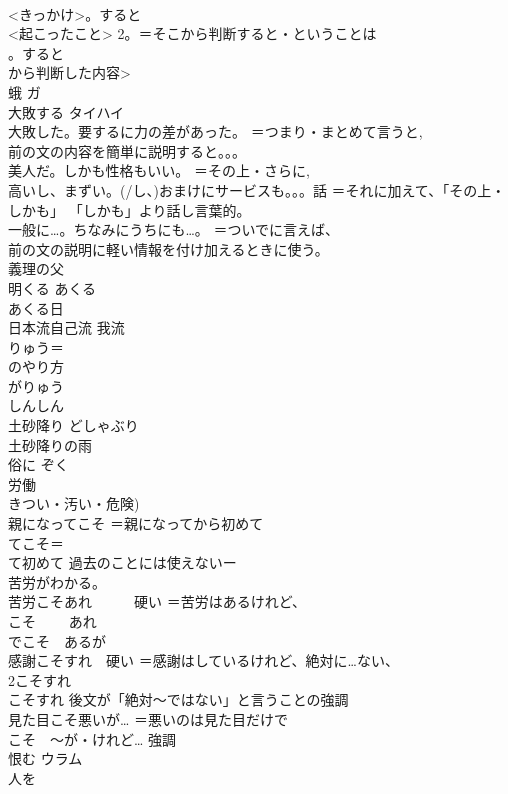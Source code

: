 \documentclass[8pt]{extreport}
\begin{document}
\begin{CJK}{UTF8}{min}
\\	<きっかけ>。すると
\\	<起こったこと> 2。＝そこから判断すると・ということは 　　
\\	。すると
\\	から判断した内容>
\\	蛾	ガ 
\\	大敗する	タイハイ 
\\	大敗した。要するに力の差があった。	＝つまり・まとめて言うと, 
\\	前の文の内容を簡単に説明すると。。。
\\	美人だ。しかも性格もいい。	＝その上・さらに, 
\\	高いし、まずい。(/し、)おまけにサービスも。。。話	＝それに加えて、「その上・しかも」 「しかも」より話し言葉的。
\\	一般に…。ちなみにうちにも…。	＝ついでに言えば、
\\	前の文の説明に軽い情報を付け加えるときに使う。
\\	義理の父	
\\	明くる	あくる 
\\	あくる日 
\\	日本流自己流 我流	
\\	りゅう＝
\\	のやり方 
\\	がりゅう
\\	しんしん	
\\	土砂降り	どしゃぶり 
\\	土砂降りの雨
\\	俗に	ぞく 
\\	労働	
\\	きつい・汚い・危険) 
\\	親になってこそ	＝親になってから初めて 
\\	てこそ＝
\\	て初めて 過去のことには使えないー
\\	苦労がわかる。
\\	苦労こそあれ　　　硬い	＝苦労はあるけれど、
\\	こそ　　 あれ 
\\	でこそ　あるが
\\	感謝こそすれ　硬い	＝感謝はしているけれど、絶対に…ない、
\\	2こそすれ 
\\	こそすれ 後文が「絶対〜ではない」と言うことの強調
\\	見た目こそ悪いが…	＝悪いのは見た目だけで 
\\	こそ　〜が・けれど… 強調
\\	恨む	ウラム 
\\	人を
\end{CJK}
\end{document}
